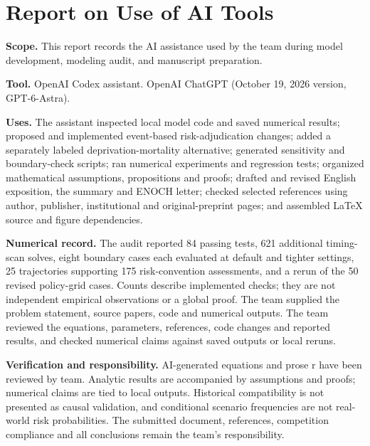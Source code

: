 \documentclass[12pt,a4paper]{article}
\theoremstyle{remark}
\begin{document}
\clearpage
\section*{Report on Use of AI Tools}
\textbf{Scope.} This report records the AI assistance used by the team during model development, modeling audit, and manuscript preparation. 

\textbf{Tool.} OpenAI Codex assistant. OpenAI ChatGPT (October 19, 2026 version, GPT-6-Astra).

\textbf{Uses.} The assistant inspected local model code and saved numerical results; proposed and implemented event-based risk-adjudication changes; added a separately labeled deprivation-mortality alternative; generated sensitivity and boundary-check scripts; ran numerical experiments and regression tests; organized mathematical assumptions, propositions and proofs; drafted and revised English exposition, the summary and ENOCH letter; checked selected references using author, publisher, institutional and original-preprint pages; and assembled LaTeX source and figure dependencies.


\textbf{Numerical record.} The audit reported 84 passing tests, 621 additional timing-scan solves, eight boundary cases each evaluated at default and tighter settings, 25 trajectories supporting 175 risk-convention assessments, and a rerun of the 50 revised policy-grid cases. Counts describe implemented checks; they are not independent empirical observations or a global proof. The team supplied the problem statement, source papers, code and numerical
outputs. The team reviewed the equations,
parameters, references, code changes and reported results, and checked numerical
claims against saved outputs or local reruns.

\textbf{Verification and responsibility.} AI-generated equations and prose r have been reviewed by team. Analytic results are accompanied by assumptions and proofs; numerical claims are tied to local outputs. Historical compatibility is not presented as causal validation, and conditional scenario frequencies are not real-world risk probabilities. The submitted document, references, competition compliance and all conclusions remain the team's responsibility.
\end{document}

